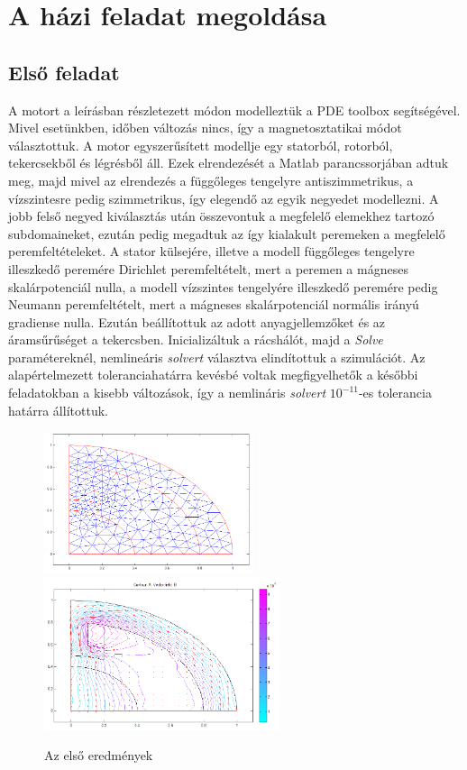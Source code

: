 \chapter{A házi feladat megoldása}
\section{Első feladat}
A motort a leírásban részletezett módon modelleztük a PDE toolbox segítségével. Mivel esetünkben, időben változás nincs, így a magnetosztatikai módot választottuk. A motor egyszerűsített modellje egy statorból, rotorból, tekercsekből és légrésből áll. Ezek elrendezését a Matlab parancssorjában adtuk meg, majd mivel az elrendezés a függőleges tengelyre antiszimmetrikus, a vízszintesre pedig szimmetrikus, így elegendő az egyik negyedet modellezni. A jobb felső negyed kiválasztás után összevontuk a megfelelő elemekhez tartozó subdomaineket, ezután pedig megadtuk az így kialakult peremeken a megfelelő peremfeltételeket. A stator külsejére, illetve a  modell függőleges tengelyre illeszkedő peremére Dirichlet peremfeltételt, mert a peremen a mágneses skalárpotenciál nulla, a modell vízszintes tengelyére illeszkedő peremére pedig Neumann peremfeltételt, mert a mágneses skalárpotenciál normális irányú gradiense nulla. Ezután beállítottuk az adott anyagjellemzőket és az áramsűrűséget a tekercsben. Inicializáltuk a rácshálót, majd a \textit{Solve} paramétereknél, nemlineáris \textit{solvert} választva elindítottuk a szimulációt. Az alapértelmezett toleranciahatárra kevésbé voltak megfigyelhetők a későbbi feladatokban a kisebb változások, így a nemlináris \textit{solvert}  $ 10^{-11} $-es tolerancia határra állítottuk.
 \begin{figure}[!h]
	\centering
	\includegraphics[width=61.5mm, keepaspectratio]{figures/terek/nl_1_init_mesh.png}\hspace{5mm}
	\includegraphics[width=69mm, keepaspectratio]{figures/terek/nl_1_init.png}
	\caption{Az első eredmények}
	\label{fig:calib}
\end{figure}


